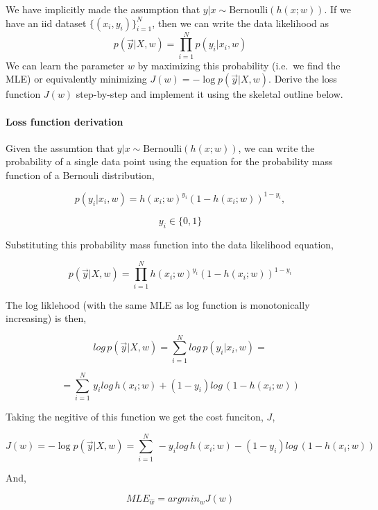 \documentclass[11pt]{article}
\begin{document}
We have implicitly made the assumption that
\(y|x \sim \mathrm{Bernoulli}(h(x;w))\). If we have an iid dataset
\(\{(x_i,y_i)\}_{i=1}^N\), then we can write the data likelihood as \[
p(\vec{y}| X, w) = \prod_{i=1}^N p(y_i | x_i, w)
\] We can learn the parameter \(w\) by maximizing this probability
(i.e.~we find the MLE) or equivalently minimizing
\(J(w) = -\log p(\vec{y} | X, w)\). Derive the loss function \(J(w)\)
step-by-step and implement it using the skeletal outline below.

    \hypertarget{loss-function-derivation}{%
\paragraph{Loss function derivation}\label{loss-function-derivation}}

Given the assumtion that \(y|x \sim \mathrm{Bernoulli}(h(x;w))\), we can
write the probability of a single data point using the equation for the
probability mass function of a Bernouli distribution,

\[
 p(y_i | x_i, w) = h(x_i;w)^{y_i} (1 - h(x_i;w))^{1-y_i},
\]

\[
 y_i \in \{ 0, 1 \}
\]

Substituting this probability mass function into the data likelihood
equation,

\[
p(\vec{y} | X, w) = \prod_{i=1}^N h(x_i;w)^{y_i} (1 - h(x_i;w))^{1-y_i}
\]

The log liklehood (with the same MLE as log function is monotonically
increasing) is then,

\[
log \, p(\vec{y} | X, w) = \sum_{i=1}^N log \, p(y_i | x_i, w) =
\]

\[
 = \sum_{i=1}^N \, y_i log \, h(x_i;w) + (1-y_i) log \, (1 - h(x_i;w))
\]

Taking the negitive of this function we get the cost funciton, \(J\),

\[
J(w) = -\log p(\vec{y} | X, w) = \sum_{i=1}^N \, -y_i log \, h(x_i;w) - (1-y_i) log \, (1 - h(x_i;w))
\]

And,

\[
MLE_{\hat{w}} = argmin_w J(w)
\]
\end{document}
